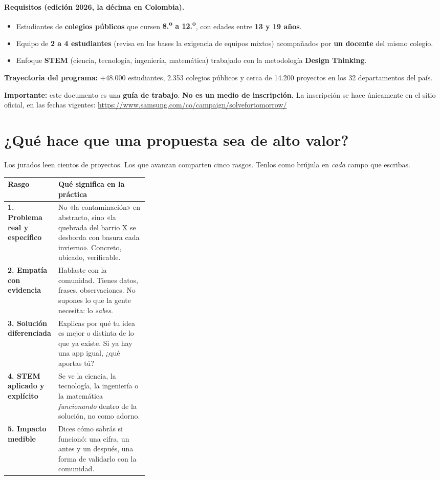 \documentclass[11pt, letterpaper]{article}
\begin{document}
\begin{oficial}
\setlength{\parskip}{3pt}
\textbf{Requisitos (edición 2026, la décima en Colombia).}
\begin{itemize}[nosep]
  \item Estudiantes de \textbf{colegios públicos} que cursen \textbf{8.\textsuperscript{o} a 12.\textsuperscript{o}}, con edades entre \textbf{13 y 19 años}.
  \item Equipo de \textbf{2 a 4 estudiantes} (revisa en las bases la exigencia de equipos mixtos) acompañados por \textbf{un docente} del mismo colegio.
  \item Enfoque \textbf{STEM} (ciencia, tecnología, ingeniería, matemática) trabajado con la metodología \textbf{Design Thinking}.
\end{itemize}
\textbf{Trayectoria del programa:} +48.000 estudiantes, 2.353 colegios públicos y cerca de 14.200 proyectos en los 32 departamentos del país.

\smallskip
\textbf{Importante:} este documento es una \textbf{guía de trabajo}. \textbf{No es un medio de inscripción.} La inscripción se hace únicamente en el sitio oficial, en las fechas vigentes: \url{https://www.samsung.com/co/campaign/solvefortomorrow/}
\end{oficial}

\section{¿Qué hace que una propuesta sea de alto valor?}

Los jurados leen cientos de proyectos. Los que avanzan comparten cinco rasgos. Tenlos como brújula en \emph{cada} campo que escribas.

\begin{center}
\renewcommand{\arraystretch}{1.35}
\begin{tabularx}{\linewidth}{@{}p{0.32\linewidth} X@{}}
\toprule
\textbf{\color{smjAzul}Rasgo} & \textbf{\color{smjAzul}Qué significa en la práctica}\\
\midrule
\textbf{1. Problema real y específico} & No «la contaminación» en abstracto, sino «la quebrada del barrio X se desborda con basura cada invierno». Concreto, ubicado, verificable.\\
\textbf{2. Empatía con evidencia} & Hablaste con la comunidad. Tienes datos, frases, observaciones. No supones lo que la gente necesita: lo \emph{sabes}.\\
\textbf{3. Solución diferenciada} & Explicas por qué tu idea es mejor o distinta de lo que ya existe. Si ya hay una app igual, ¿qué aportas tú?\\
\textbf{4. STEM aplicado y explícito} & Se ve la ciencia, la tecnología, la ingeniería o la matemática \emph{funcionando} dentro de la solución, no como adorno.\\
\textbf{5. Impacto medible} & Dices cómo sabrás si funcionó: una cifra, un antes y un después, una forma de validarlo con la comunidad.\\
\bottomrule
\end{tabularx}
\end{center}
\end{document}
